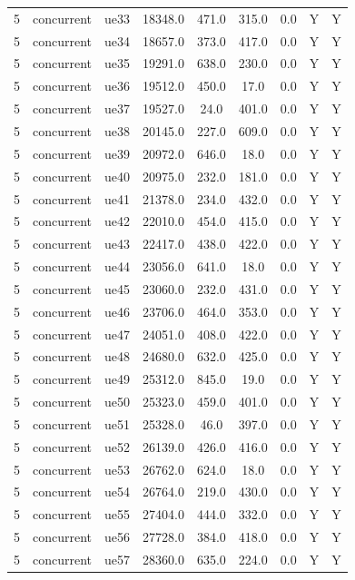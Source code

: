 \begin{table}[ht]
\begin{tabular}{|c|c|c|c|c|c|c|c|c|}
5 & concurrent & ue33 & 18348.0 & 471.0 & 315.0 & 0.0 & Y & Y \\
5 & concurrent & ue34 & 18657.0 & 373.0 & 417.0 & 0.0 & Y & Y \\
5 & concurrent & ue35 & 19291.0 & 638.0 & 230.0 & 0.0 & Y & Y \\
5 & concurrent & ue36 & 19512.0 & 450.0 & 17.0 & 0.0 & Y & Y \\
5 & concurrent & ue37 & 19527.0 & 24.0 & 401.0 & 0.0 & Y & Y \\
5 & concurrent & ue38 & 20145.0 & 227.0 & 609.0 & 0.0 & Y & Y \\
5 & concurrent & ue39 & 20972.0 & 646.0 & 18.0 & 0.0 & Y & Y \\
5 & concurrent & ue40 & 20975.0 & 232.0 & 181.0 & 0.0 & Y & Y \\
5 & concurrent & ue41 & 21378.0 & 234.0 & 432.0 & 0.0 & Y & Y \\
5 & concurrent & ue42 & 22010.0 & 454.0 & 415.0 & 0.0 & Y & Y \\
5 & concurrent & ue43 & 22417.0 & 438.0 & 422.0 & 0.0 & Y & Y \\
5 & concurrent & ue44 & 23056.0 & 641.0 & 18.0 & 0.0 & Y & Y \\
5 & concurrent & ue45 & 23060.0 & 232.0 & 431.0 & 0.0 & Y & Y \\
5 & concurrent & ue46 & 23706.0 & 464.0 & 353.0 & 0.0 & Y & Y \\
5 & concurrent & ue47 & 24051.0 & 408.0 & 422.0 & 0.0 & Y & Y \\
5 & concurrent & ue48 & 24680.0 & 632.0 & 425.0 & 0.0 & Y & Y \\
5 & concurrent & ue49 & 25312.0 & 845.0 & 19.0 & 0.0 & Y & Y \\
5 & concurrent & ue50 & 25323.0 & 459.0 & 401.0 & 0.0 & Y & Y \\
5 & concurrent & ue51 & 25328.0 & 46.0 & 397.0 & 0.0 & Y & Y \\
5 & concurrent & ue52 & 26139.0 & 426.0 & 416.0 & 0.0 & Y & Y \\
5 & concurrent & ue53 & 26762.0 & 624.0 & 18.0 & 0.0 & Y & Y \\
5 & concurrent & ue54 & 26764.0 & 219.0 & 430.0 & 0.0 & Y & Y \\
5 & concurrent & ue55 & 27404.0 & 444.0 & 332.0 & 0.0 & Y & Y \\
5 & concurrent & ue56 & 27728.0 & 384.0 & 418.0 & 0.0 & Y & Y \\
5 & concurrent & ue57 & 28360.0 & 635.0 & 224.0 & 0.0 & Y & Y \\

\end{tabular}
\end{table}
